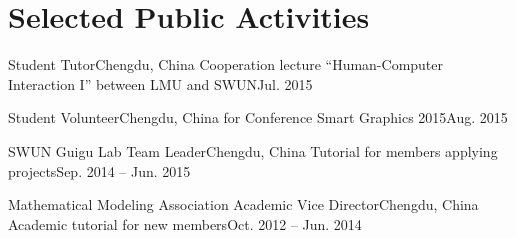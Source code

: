\section{\textbf{Selected Public Activities}}
  \resumeSubHeadingListStart

    \resumeSubheading
        {Student Tutor}{Chengdu, China}
        {Cooperation lecture “Human-Computer Interaction I” between LMU and SWUN}{Jul. 2015}

    \resumeSubheading
        {Student Volunteer}{Chengdu, China}
        {for Conference Smart Graphics 2015}{Aug. 2015}

    \resumeSubheading
        {SWUN Guigu Lab Team Leader}{Chengdu, China}
        {Tutorial for members applying projects}{Sep. 2014 -- Jun. 2015}

    \resumeSubheading
        {Mathematical Modeling Association Academic Vice Director}{Chengdu, China}
        {Academic tutorial for new members}{Oct. 2012 -- Jun. 2014}

  \resumeSubHeadingListEnd